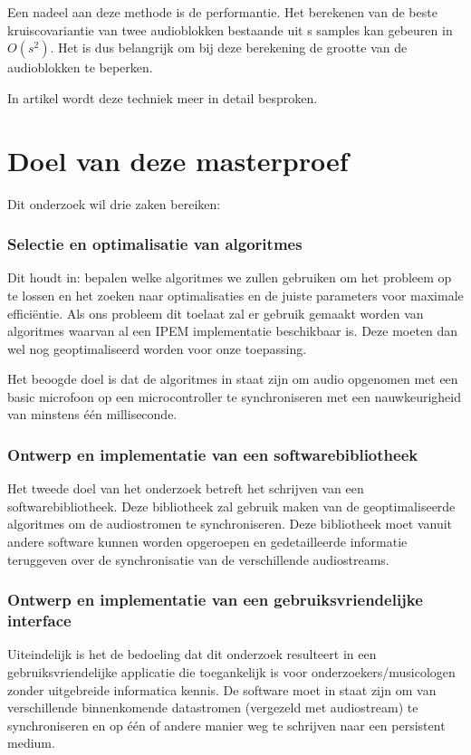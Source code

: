 Een nadeel aan deze methode is de performantie. Het berekenen van de beste kruiscovariantie van twee audioblokken bestaande uit s samples kan gebeuren in  $O(s^{2})$. Het is dus belangrijk om bij deze berekening de grootte van de audioblokken te beperken.

In artikel \citealp{six2015multimodal} wordt deze techniek meer in detail besproken.

\section{Doel van deze masterproef}

Dit onderzoek wil drie zaken bereiken: 

\subsubsection{Selectie en optimalisatie van algoritmes}
Dit houdt in: bepalen welke algoritmes we zullen gebruiken om het probleem op te lossen en het zoeken naar optimalisaties en de juiste parameters voor maximale efficiëntie. Als ons probleem dit toelaat zal er gebruik gemaakt worden van algoritmes waarvan al een IPEM implementatie beschikbaar is. Deze moeten dan wel nog geoptimaliseerd worden voor onze toepassing. 

Het beoogde doel is dat de algoritmes in staat zijn om audio opgenomen met een basic microfoon op een microcontroller te synchroniseren met een nauwkeurigheid van minstens één milliseconde.

\subsubsection{Ontwerp en implementatie van een softwarebibliotheek}
Het tweede doel van het onderzoek betreft het schrijven van een softwarebibliotheek. Deze bibliotheek zal gebruik maken van de geoptimaliseerde algoritmes om de audiostromen te synchroniseren. Deze bibliotheek moet vanuit andere software kunnen worden opgeroepen en gedetailleerde informatie teruggeven over de synchronisatie van de verschillende audiostreams.

\subsubsection{Ontwerp en implementatie van een gebruiksvriendelijke interface}

Uiteindelijk is het de bedoeling dat dit onderzoek resulteert in een gebruiksvriendelijke applicatie die toegankelijk is voor onderzoekers/musicologen zonder uitgebreide informatica kennis. De software moet in staat zijn om van verschillende binnenkomende datastromen (vergezeld met audiostream) te synchroniseren en op één of andere manier weg te schrijven naar een persistent medium.
